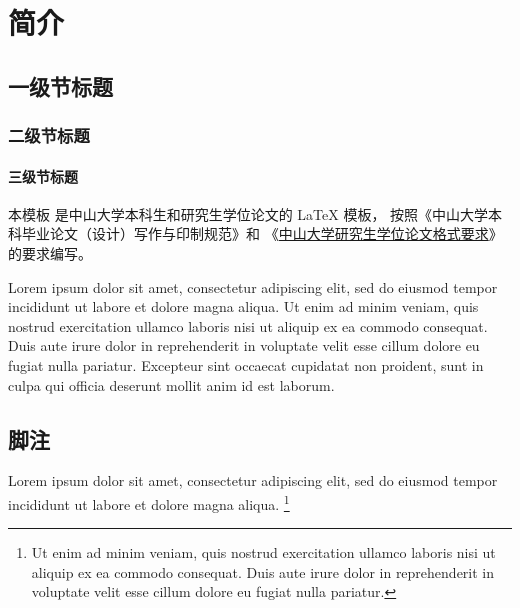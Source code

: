 
\chapter{简介}

\section{一级节标题}

\subsection{二级节标题}

\subsubsection{三级节标题}


本模板  是中山大学本科生和研究生学位论文的 \LaTeX{}
模板\cite{knuth86a}， 按照《中山大学本科毕业论文（设计）写作与印制规范》和
《\href{https://graduate.sysu.edu.cn/sites/default/files/2019-04/中山大学研究生学位论文格式要求.pdf}
{中山大学研究生学位论文格式要求}》的要求编写。

Lorem ipsum dolor sit amet, consectetur adipiscing elit, sed do eiusmod tempor
incididunt ut labore et dolore magna aliqua.
Ut enim ad minim veniam, quis nostrud exercitation ullamco laboris nisi ut
aliquip ex ea commodo consequat.
Duis aute irure dolor in reprehenderit in voluptate velit esse cillum dolore eu
fugiat nulla pariatur.
Excepteur sint occaecat cupidatat non proident, sunt in culpa qui officia
deserunt mollit anim id est laborum.



\section{脚注}

Lorem ipsum dolor sit amet, consectetur adipiscing elit, sed do eiusmod tempor
incididunt ut labore et dolore magna aliqua.
\footnote{Ut enim ad minim veniam, quis nostrud exercitation ullamco laboris
  nisi ut aliquip ex ea commodo consequat.
  Duis aute irure dolor in reprehenderit in voluptate velit esse cillum dolore
  eu fugiat nulla pariatur.}
